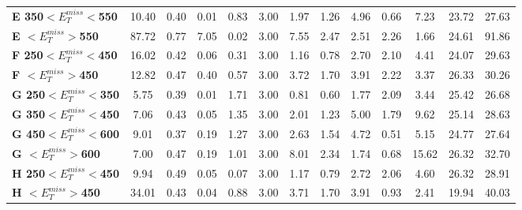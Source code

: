 \begin{table}[h]
\begin{center}
{\begin{tabular}{|l|cccccccccccc|}
\textbf{ E 350$<E_T^{miss}<$550}         & 10.40         & 0.40          & 0.01          & 0.83          & 3.00          & 1.97          & 1.26          & 4.96          & 0.66          & 7.23          & 23.72         & 27.63         \\
\textbf{ E $<E_T^{miss}>$550}    & 87.72         & 0.77          & 7.05          & 0.02          & 3.00          & 7.55          & 2.47          & 2.51          & 2.26          & 1.66          & 24.61         & 91.86         \\
\textbf{ F 250$<E_T^{miss}<$450}         & 16.02         & 0.42          & 0.06          & 0.31          & 3.00          & 1.16          & 0.78          & 2.70          & 2.10          & 4.41          & 24.07         & 29.63         \\
\textbf{ F $<E_T^{miss}>$450}    & 12.82         & 0.47          & 0.40          & 0.57          & 3.00          & 3.72          & 1.70          & 3.91          & 2.22          & 3.37          & 26.33         & 30.26         \\
\textbf{ G 250$<E_T^{miss}<$350}         & 5.75          & 0.39          & 0.01          & 1.71          & 3.00          & 0.81          & 0.60          & 1.77          & 2.09          & 3.44          & 25.42         & 26.68         \\
\textbf{ G 350$<E_T^{miss}<$450}         & 7.06          & 0.43          & 0.05          & 1.35          & 3.00          & 2.01          & 1.23          & 5.00          & 1.79          & 9.62          & 25.14         & 28.63         \\
\textbf{ G 450$<E_T^{miss}<$600}         & 9.01          & 0.37          & 0.19          & 1.27          & 3.00          & 2.63          & 1.54          & 4.72          & 0.51          & 5.15          & 24.77         & 27.64         \\
\textbf{ G $<E_T^{miss}>$600}    & 7.00          & 0.47          & 0.19          & 1.01          & 3.00          & 8.01          & 2.34          & 1.74          & 0.68          & 15.62         & 26.32         & 32.70         \\
\textbf{ H 250$<E_T^{miss}<$450}         & 9.94          & 0.49          & 0.05          & 0.07          & 3.00          & 1.17          & 0.79          & 2.72          & 2.06          & 4.60          & 26.32         & 28.91         \\
\textbf{ H $<E_T^{miss}>$450}    & 34.01         & 0.43          & 0.04          & 0.88          & 3.00          & 3.71          & 1.70          & 3.91          & 0.93          & 2.41          & 19.94         & 40.03         \\

\end{tabular}}
\end{center}
\end{table}
